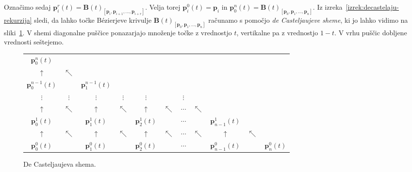 \documentclass[isrm2, tisk]{fmfdelo}
\newcommand{\p}{\mathbf{p}}
\newcommand{\bigbbt}{\textbf{B}(t)}
\begin{document}
    Označimo sedaj $\p_{i}^r(t) = \bigbbt_{[\p_i,\p_{i+1},\dots,\p_{i+r}]}$.
    Velja torej $\p_{i}^0(t)=\p_i$ in  $\p_{0}^n(t)=\bigbbt_{[\p_0,\p_1,\dots,\p_n]}$.
    Iz izreka~\ref{izrek:decastelaju-rekurzija} sledi, da lahko točke Bézierjeve krivulje $\bigbbt_{[\p_0,\p_1,\dots,\p_n]}$ računamo s pomočjo \textit{de Casteljaujeve sheme}, ki jo lahko vidimo na sliki~\ref{fig:decasteljau-scheme}.
    V shemi diagonalne puščice ponazarjajo množenje točke z vrednostjo $t$, vertikalne pa z vrednostjo $1-t$.
    V vrhu puščic dobljene vrednosti seštejemo.
    \begin{figure}[H]
        \label{fig:decasteljau-scheme}
        \begin{tabular}{ c c c c c c c c c c c}
            $\p_{0}^n(t)$     &            &                   &            &               &            &          &            &                 &            &               \\
            $\uparrow$        & $\nwarrow$ &                   &            &               &            &          &            &                 &            &               \\
            $\p_{0}^{n-1}(t)$ &            & $\p_{1}^{n-1}(t)$ &            &               &            &          &            &                 &            &               \\
            $\vdots$          & $\vdots$   & $\vdots$          & $\vdots$   & $\vdots$      &            & $\vdots$ &            &                 &            &               \\
            $\uparrow$        & $\nwarrow$ & $\uparrow$        & $\nwarrow$ & $\uparrow$    & $\nwarrow$ & $\cdots$ & $\nwarrow$ &                 &            &               \\
            $\p_{0}^1(t)$     &            & $\p_{1}^1(t)$     &            & $\p_{2}^1(t)$ &            & $\cdots$ &            & $\p_{n-1}^1(t)$ &            &               \\
            $\uparrow$        & $\nwarrow$ & $\uparrow$        & $\nwarrow$ & $\uparrow$    & $\nwarrow$ & $\cdots$ & $\nwarrow$ & $\uparrow$      & $\nwarrow$     &\\
            $\p_{0}^0(t)$     &            & $\p_{1}^0(t)$     &            & $\p_{2}^0(t)$ &            & $\cdots$ &            & $\p_{n-1}^0(t)$ &            & $\p_{n}^0(t)$
        \end{tabular}
        \caption{De Casteljaujeva shema.}
    \end{figure}
\end{document}
